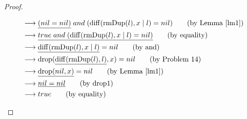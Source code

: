 \documentclass[12pt, a4paper]{article}
\newcommand{\rel}[1]{\mathrel{#1}}
\newcommand{\rmx}[1]{\mathrm{#1}}
\newcommand{\larrow}{\longrightarrow}
\newcommand{\under}{\underline}
\begin{document}
\begin{proof}
\begin{description}
\begin{align*}
	&\larrow \under{(nil = nil)} \rel{and} (\rmx{diff}(\rmx{rmDup}(l), x \mid l) = nil) \tag{by Lemma~\ref{lm1}} \\
	&\larrow \under{true \rel{and} (\rmx{diff}(\rmx{rmDup}(l), x \mid l) = nil)} \tag{by equality} \\
	&\larrow \under{\rmx{diff}(\rmx{rmDup}(l), x \mid l)} = nil \tag{by and} \\
	&\larrow \rmx{drop}(\under{\rmx{diff}(\rmx{rmDup}(l), l)}, x) = nil \tag{by Problem 14} \\
	&\larrow \under{\rmx{drop}(nil, x)} = nil \tag{by Lemma~\ref{lm1}} \\
	&\larrow \under{nil = nil} \tag{by drop1} \\
	&\larrow true \tag{by equality}
\end{align*}


\end{description}
\end{proof}
\end{document}
